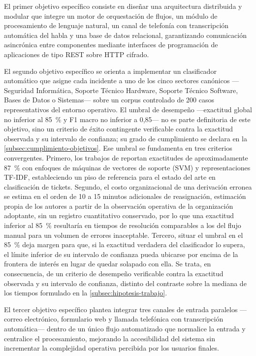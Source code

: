 El primer objetivo específico consiste en diseñar una arquitectura distribuida y modular que integre un motor de orquestación de flujos, un módulo de procesamiento de lenguaje natural, un canal de telefonía con transcripción automática del habla y una base de datos relacional, garantizando comunicación asincrónica entre componentes mediante interfaces de programación de aplicaciones de tipo REST sobre HTTP cifrado.

El segundo objetivo específico se orienta a implementar un clasificador automático que asigne cada incidente a uno de los cinco sectores canónicos ---Seguridad Informática, Soporte Técnico Hardware, Soporte Técnico Software, Bases de Datos o Sistemas--- sobre un corpus controlado de 200 casos representativos del entorno operativo. El umbral de desempeño ---exactitud global no inferior al 85~\% y F1 macro no inferior a 0,85--- no es parte definitoria de este objetivo, sino un criterio de éxito contingente verificable contra la exactitud observada y su intervalo de confianza; su grado de cumplimiento se declara en la \autoref{subsec:cumplimiento-objetivos}. Ese umbral se fundamenta en tres criterios convergentes. Primero, los trabajos de \textcite{Paramesh2019_it_service_desk} reportan exactitudes de aproximadamente 87~\% con enfoques de máquinas de vectores de soporte (SVM) y representaciones TF-IDF, estableciendo un piso de referencia para el estado del arte en clasificación de tickets. Segundo, el costo organizacional de una derivación erronea se estima en el orden de 10 a 15 minutos adicionales de reasignación, estimación propia de los autores a partir de la observación operativa de la organización adoptante, sin un registro cuantitativo conservado, por lo que una exactitud inferior al 85~\% resultaría en tiempos de resolución comparables a los del flujo manual para un volumen de errores inaceptable. Tercero, situar el umbral en el 85~\% deja margen para que, si la exactitud verdadera del clasificador lo supera, el límite inferior de su intervalo de confianza pueda ubicarse por encima de la frontera de interés en lugar de quedar solapado con ella. Se trata, en consecuencia, de un criterio de desempeño verificable contra la exactitud observada y su intervalo de confianza, distinto del contraste sobre la mediana de los tiempos formulado en la \autoref{subsec:hipotesis-trabajo}.

El tercer objetivo específico plantea integrar tres canales de entrada paralelos ---correo electrónico, formulario web y llamada telefónica con transcripción automática--- dentro de un único flujo automatizado que normalice la entrada y centralice el procesamiento, mejorando la accesibilidad del sistema sin incrementar la complejidad operativa percibida por los usuarios finales.

